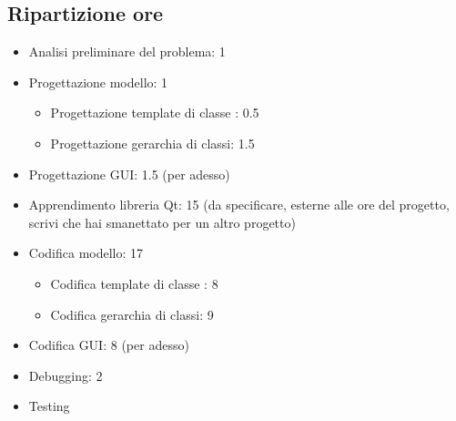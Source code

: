 \subsection{Ripartizione ore} %
\label{sub:ripartizione_ore}
\begin{itemize}
	\item Analisi preliminare del problema: 1
	\item Progettazione modello: 1
	\begin{itemize}
		\item Progettazione template di classe : 0.5
		\item Progettazione gerarchia di classi: 1.5
	\end{itemize}
	\item Progettazione GUI: 1.5 (per adesso)
	\item Apprendimento libreria Qt: 15 (da specificare, esterne alle ore del progetto, scrivi che hai smanettato per un altro progetto)
	\item Codifica modello: 17
	\begin{itemize}
		\item Codifica template di classe : 8
		\item Codifica gerarchia di classi: 9
	\end{itemize}
	\item Codifica GUI: 8 (per adesso)
	\item Debugging: 2
	\item Testing
\end{itemize}
